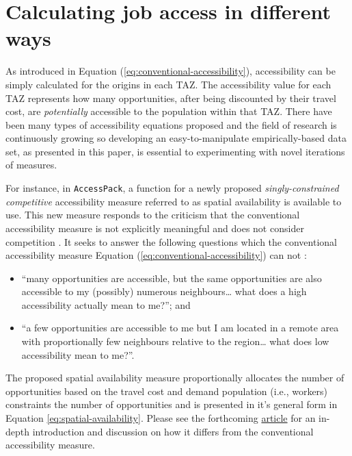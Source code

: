 \documentclass[Royal,times,sageh]{sagej}
\providecommand{\tightlist}{%
  \setlength{\itemsep}{0pt}\setlength{\parskip}{0pt}}
\begin{document}
\hypertarget{calculating-job-access-in-different-ways}{%
\section{Calculating job access in different
ways}\label{calculating-job-access-in-different-ways}}

As introduced in Equation (\ref{eq:conventional-accessibility}),
accessibility can be simply calculated for the origins in each TAZ. The
accessibility value for each TAZ represents how many opportunities,
after being discounted by their travel cost, are \emph{potentially}
accessible to the population within that TAZ. There have been many types
of accessibility equations proposed and the field of research is
continuously growing so developing an easy-to-manipulate
empirically-based data set, as presented in this paper, is essential to
experimenting with novel iterations of measures.

For instance, in \texttt{AccessPack}, a function for a newly proposed
\emph{singly-constrained competitive} accessibility measure referred to
as spatial availability is available to use. This new measure responds
to the criticism that the conventional accessibility measure is not
explicitly meaningful \citep{miller2018} and does not consider
competition \citep{luo2003}. It seeks to answer the following questions
which the conventional accessibility measure Equation
(\ref{eq:conventional-accessibility}) can not :

\begin{itemize}
\tightlist
\item
  ``many opportunities are accessible, but the same opportunities are
  also accessible to my (possibly) numerous neighbours\ldots{} what does
  a high accessibility actually mean to me?''; and
\item
  ``a few opportunities are accessible to me but I am located in a
  remote area with proportionally few neighbours relative to the
  region\ldots{} what does low accessibility mean to me?''.
\end{itemize}

The proposed spatial availability measure proportionally allocates the
number of opportunities based on the travel cost and demand population
(i.e., workers) constraints the number of opportunities and is presented
in it's general form in Equation \ref{eq:spatial-availability}. Please
see the forthcoming
\href{https://github.com/soukhova/Spatial-Availability-Measure}{article}
for an in-depth introduction and discussion on how it differs from the
conventional accessibility measure.
\end{document}
